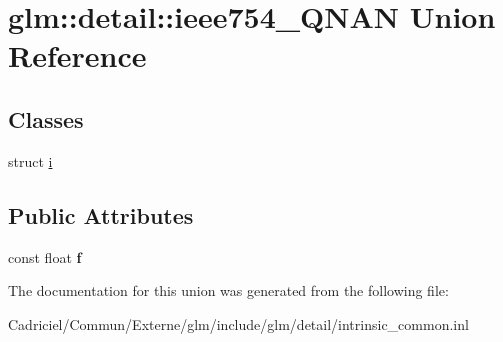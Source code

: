 \hypertarget{unionglm_1_1detail_1_1ieee754___q_n_a_n}{}\section{glm\+:\+:detail\+:\+:ieee754\+\_\+\+Q\+N\+AN Union Reference}
\label{unionglm_1_1detail_1_1ieee754___q_n_a_n}
\subsection*{Classes}
\begin{DoxyCompactItemize}
\item 
struct \hyperlink{structglm_1_1detail_1_1ieee754___q_n_a_n_1_1i}{i}
\end{DoxyCompactItemize}
\subsection*{Public Attributes}
\begin{DoxyCompactItemize}
\item 
const float {\bfseries f}\hypertarget{unionglm_1_1detail_1_1ieee754___q_n_a_n_ac5f04f4e605e4d08ddc2bacddf7eee65}{}\label{unionglm_1_1detail_1_1ieee754___q_n_a_n_ac5f04f4e605e4d08ddc2bacddf7eee65}

\end{DoxyCompactItemize}


The documentation for this union was generated from the following file\+:\begin{DoxyCompactItemize}
\item 
Cadriciel/\+Commun/\+Externe/glm/include/glm/detail/intrinsic\+\_\+common.\+inl\end{DoxyCompactItemize}
